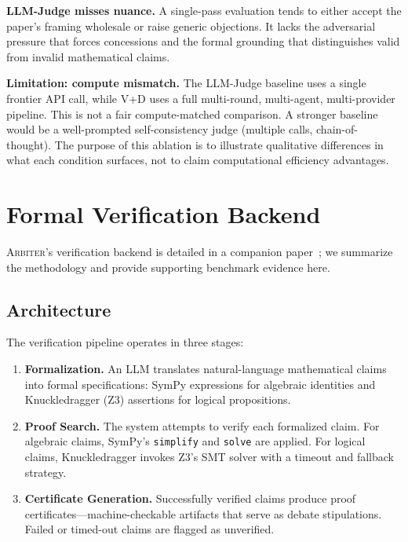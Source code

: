 \documentclass[11pt]{article}
\newcommand{\arbiter}{\textsc{Arbiter}}
\begin{document}
\textbf{LLM-Judge misses nuance.}
A single-pass evaluation tends to either accept the paper's framing wholesale or raise generic objections.
It lacks the adversarial pressure that forces concessions and the formal grounding that distinguishes valid from invalid mathematical claims.

\noindent\textbf{Limitation: compute mismatch.} The LLM-Judge baseline uses a single frontier API call, while V+D uses a full multi-round, multi-agent, multi-provider pipeline. This is not a fair compute-matched comparison. A stronger baseline would be a well-prompted self-consistency judge (multiple calls, chain-of-thought). The purpose of this ablation is to illustrate qualitative differences in what each condition surfaces, not to claim computational efficiency advantages.


\section{Formal Verification Backend}
\label{sec:verification}

\arbiter{}'s verification backend is detailed in a companion paper~\cite{arbiterpaperA}; we summarize the methodology and provide supporting benchmark evidence here.

\subsection{Architecture}

The verification pipeline operates in three stages:
\begin{enumerate}[leftmargin=*,itemsep=2pt]
\item \textbf{Formalization.} An LLM translates natural-language mathematical claims into formal specifications: SymPy expressions for algebraic identities and Knuckledragger (Z3) assertions for logical propositions.
\item \textbf{Proof Search.} The system attempts to verify each formalized claim. For algebraic claims, SymPy's \texttt{simplify} and \texttt{solve} are applied. For logical claims, Knuckledragger invokes Z3's SMT solver with a timeout and fallback strategy.
\item \textbf{Certificate Generation.} Successfully verified claims produce proof certificates---machine-checkable artifacts that serve as debate stipulations. Failed or timed-out claims are flagged as unverified.
\end{enumerate}
\end{document}
